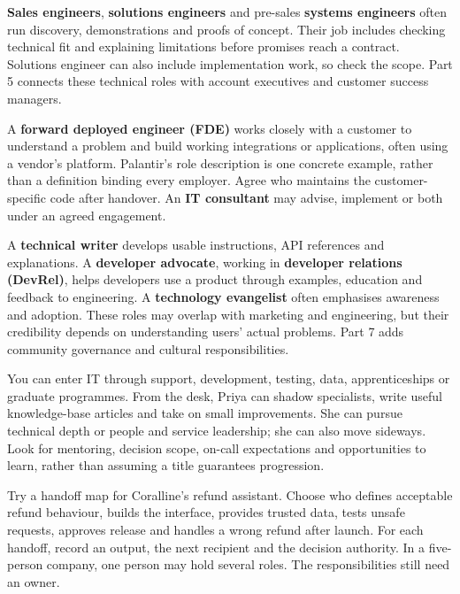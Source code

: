 \textbf{Sales engineers}, \textbf{solutions engineers} and pre-sales \textbf{systems engineers} often run discovery, demonstrations and proofs of concept. Their job includes checking technical fit and explaining limitations before promises reach a contract. Solutions engineer can also include implementation work, so check the scope. Part 5 connects these technical roles with account executives and customer success managers.


A \textbf{forward deployed engineer (FDE)} works closely with a customer to understand a problem and build working integrations or applications, often using a vendor's platform. Palantir's role description is one concrete example, rather than a definition binding every employer. Agree who maintains the customer-specific code after handover. An \textbf{IT consultant} may advise, implement or both under an agreed engagement. \autocite{palantir-fde-roles}


A \textbf{technical writer} develops usable instructions, API references and explanations. A \textbf{developer advocate}, working in \textbf{developer relations (DevRel)}, helps developers use a product through examples, education and feedback to engineering. A \textbf{technology evangelist} often emphasises awareness and adoption. These roles may overlap with marketing and engineering, but their credibility depends on understanding users' actual problems. Part 7 adds community governance and cultural responsibilities.


You can enter IT through support, development, testing, data, apprenticeships or graduate programmes. From the desk, Priya can shadow specialists, write useful knowledge-base articles and take on small improvements. She can pursue technical depth or people and service leadership; she can also move sideways. Look for mentoring, decision scope, on-call expectations and opportunities to learn, rather than assuming a title guarantees progression.


Try a handoff map for Coralline's refund assistant. Choose who defines acceptable refund behaviour, builds the interface, provides trusted data, tests unsafe requests, approves release and handles a wrong refund after launch. For each handoff, record an output, the next recipient and the decision authority. In a five-person company, one person may hold several roles. The responsibilities still need an owner.

